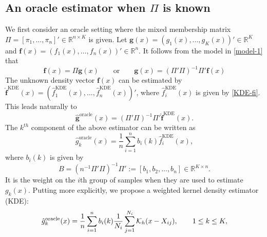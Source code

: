 \documentclass[preprint,11pt]{article}
\newcommand{\mbb}{\mathbb}
\numberwithin{equation}{section}
\newcommand{\beq}{\begin{equation}}
\newcommand{\eeq}{\end{equation}}
\begin{document}
\subsection{An oracle estimator when $\Pi$ is known} \label{subsec:oracle}

We first consider an oracle setting where the mixed membership matrix $\Pi=[\pi_1,\ldots,\pi_n]'\in\mbb{R}^{n\times K}$ is given.  Let ${\boldsymbol g}(x)=(g_1(x),\ldots,g_K(x))'\in\mathbb{R}^K$ and ${\boldsymbol f}(x)=(f_1(x),\ldots,f_n(x))'\in\mathbb{R}^n$. It follows from the model in \eqref{model-1} that
\[
{\boldsymbol f}(x) = \Pi {\boldsymbol g}(x) \qquad \mbox{or} \qquad  {\boldsymbol g}(x) =  (\Pi'\Pi)^{-1}\Pi'  {\boldsymbol f}(x)
\]
The unknown density vector ${\boldsymbol f}(x)$ can be estimated by $\widehat{\boldsymbol f}^{\text{KDE}}(x)=(\hat{f}^{\text{KDE}}_1(x),\ldots,\hat{f}^{\text{KDE}}_n(x))'$, where $\hat{f}_i^{\text{KDE}}(x)$ is given by \eqref{KDE-fi}.  This leads naturally to 
\[
\widehat{\boldsymbol g}^{\text{oracle}}(x) = (\Pi'\Pi)^{-1}\Pi' \widehat{\boldsymbol f}^{\text{KDE}}(x).  
\]
The $k^{th}$ component of the above estimator can be written as
\beq \label{oracle-equivalence} 
\hat{g}_k^{\text{oracle}}(x) = \frac{1}{n}\sum_{i=1}^n b_i(k)\hat{f}_i^{\text{KDE}}(x), 
\eeq
where $b_i(k)$ is given by
\beq \label{B}
    B=(n^{-1}\Pi'\Pi)^{-1}\Pi':=[b_1,b_2, \ldots,b_n]\in\mbb{R}^{K\times n}.
\eeq
It is the weight on the $i$th group of samples when they are used to estimate $g_k(x)$.
Putting more explicitly, we propose a weighted kernel density estimator (KDE):
\beq  \label{oracle}
\hat{g}_k^{\text{oracle}}(x)= \frac{1}{n}\sum_{i=1}^n b_i(k)\frac{1}{N_i} \sum_{j=1}^{N_i}{\cal K}_h(x-X_{ij}), \qquad 1\leq k\leq K,
\eeq



\end{document}
